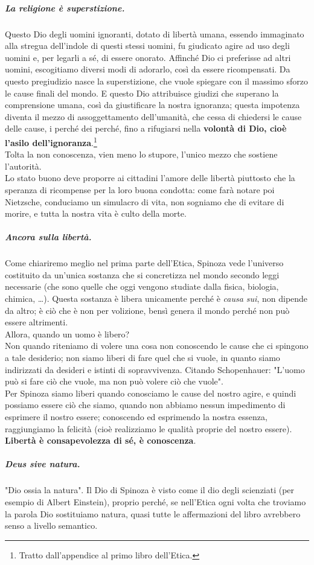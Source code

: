 \subparagraph{La religione è superstizione.} Questo Dio degli uomini ignoranti, dotato di libertà umana, essendo immaginato alla stregua dell'indole di questi stessi uomini, fu giudicato agire ad uso degli uomini e, per legarli a sé, di essere onorato. Affinché Dio ci preferisse ad altri uomini, escogitiamo diversi modi di adorarlo, così da essere ricompensati. Da questo pregiudizio nasce la superstizione, che vuole spiegare con il massimo sforzo le cause finali del mondo. E questo Dio attribuisce giudizi che superano la comprensione umana, così da giustificare la nostra ignoranza; questa impotenza diventa il mezzo di assoggettamento dell'umanità, che cessa di chiedersi le cause delle cause, i perché dei perché, fino a rifugiarsi nella  \textbf{volontà di Dio, cioè l'asilo dell'ignoranza}.\footnote{Tratto dall'appendice al primo libro dell'Etica.}\\
Tolta la non conoscenza, vien meno lo stupore, l'unico mezzo che sostiene l'autorità.\\
Lo stato buono deve proporre ai cittadini l'amore delle libertà piuttosto che la speranza di ricompense per la loro buona condotta: come farà notare poi Nietzsche, conduciamo un simulacro di vita, non sogniamo che di evitare di morire, e tutta la nostra vita è culto della morte.
\subparagraph{Ancora sulla libertà.} Come chiariremo meglio nel prima parte dell'Etica, Spinoza vede l'universo costituito da un'unica sostanza che si concretizza nel mondo secondo leggi necessarie (che sono quelle che oggi vengono studiate dalla fisica, biologia, chimica, \dots). Questa sostanza è libera unicamente perché è \textit{causa sui}, non dipende da altro; è ciò che è non per volizione, bensì genera il mondo perché non può essere altrimenti.\\
Allora, quando un uomo è libero?\\
Non quando riteniamo di volere una cosa non conoscendo le cause che ci spingono a tale desiderio; non siamo liberi di fare quel che si vuole, in quanto siamo indirizzati da desideri e istinti di sopravvivenza. Citando Schopenhauer: "L'uomo può si fare ciò che vuole, ma non può volere ciò che vuole".\\
 Per Spinoza siamo liberi quando conosciamo le cause del nostro agire, e quindi possiamo essere ciò che siamo, quando non abbiamo nessun impedimento di esprimere il nostro essere; conoscendo ed esprimendo la nostra essenza, raggiungiamo la felicità (cioè realizziamo le qualità proprie del nostro essere). \textbf{Libertà è consapevolezza di sé, è conoscenza}.
\subparagraph{Deus sive natura.} "Dio ossia la natura". Il Dio di Spinoza è visto come il dio degli scienziati (per esempio di Albert Einstein), proprio perché, se nell'Etica ogni volta che troviamo la parola Dio sostituiamo natura, quasi tutte le affermazioni del libro avrebbero senso a livello semantico. \\
